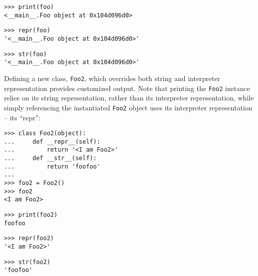 \begin{comment}
<abjad>
print(foo)
repr(foo)
str(foo)
</abjad>
\end{comment}

\begin{abjadbookoutput}
\begin{singlespacing}
\vspace{-0.5\baselineskip}
\begin{lstlisting}
>>> print(foo)
<__main__.Foo object at 0x104d096d0>
\end{lstlisting}
\begin{lstlisting}
>>> repr(foo)
'<__main__.Foo object at 0x104d096d0>'
\end{lstlisting}
\begin{lstlisting}
>>> str(foo)
'<__main__.Foo object at 0x104d096d0>'
\end{lstlisting}
\end{singlespacing}
\end{abjadbookoutput}

\noindent Defining a new class, \texttt{Foo2}, which overrides both string and
interpreter representation provides customized output. Note that printing the
\texttt{Foo2} instance relies on its string representation, rather than its
interpreter representation, while simply referencing the instantiated
\texttt{Foo2} object uses its interpreter representation -- its \enquote{repr}:

\begin{comment}
<abjad>
class Foo2(object):
    def __repr__(self):
        return '<I am Foo2>'
    def __str__(self):
        return 'foofoo'

foo2 = Foo2()
foo2
print(foo2)
repr(foo2)
str(foo2)
</abjad>
\end{comment}

\begin{abjadbookoutput}
\begin{singlespacing}
\vspace{-0.5\baselineskip}
\begin{lstlisting}
>>> class Foo2(object):
...     def __repr__(self):
...         return '<I am Foo2>'
...     def __str__(self):
...         return 'foofoo'
...
>>> foo2 = Foo2()
>>> foo2
<I am Foo2>
\end{lstlisting}
\begin{lstlisting}
>>> print(foo2)
foofoo
\end{lstlisting}
\begin{lstlisting}
>>> repr(foo2)
'<I am Foo2>'
\end{lstlisting}
\begin{lstlisting}
>>> str(foo2)
'foofoo'
\end{lstlisting}
\end{singlespacing}
\end{abjadbookoutput}

